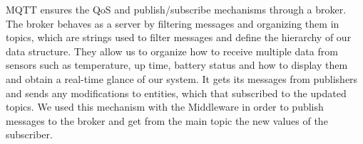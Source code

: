 MQTT ensures the QoS and publish/subscribe mechanisms through a broker. The broker behaves as a server by filtering messages and organizing them in topics, which are strings used to filter messages and define the hierarchy of our data structure. 
They allow us to organize how to receive multiple data from sensors such as temperature, up time, battery status and how to display them and obtain a real-time glance of our system.  It gets its messages from publishers and sends any modifications to entities, which that subscribed to the updated topics. We used this mechanism with the Middleware in order to publish messages to the broker and get from the main topic the new values of the subscriber.







